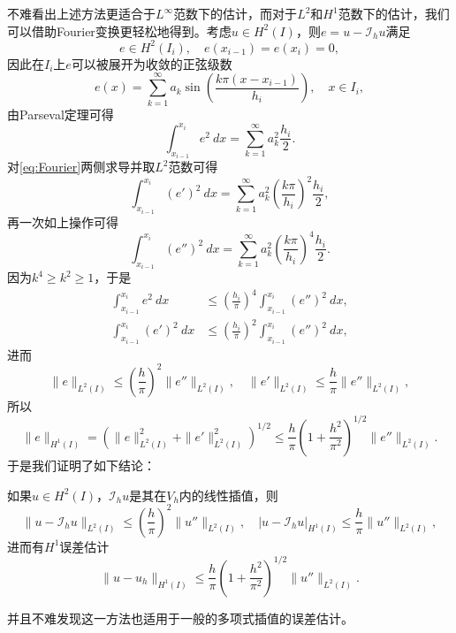 \documentclass[a4paper,10pt]{ctexart}
\begin{document}
不难看出上述方法更适合于$ L^\infty $范数下的估计，而对于$ L^2 $和$ H^1 $范数下的估计，我们可以借助Fourier变换更轻松地得到。考虑$ u\in H^2(I) $，则$ e = u - \mathcal{I}_h u $满足
\[
    e\in H^2(I_i),\quad e(x_{i-1}) = e(x_i) = 0,
\]
因此在$ I_i $上$ e $可以被展开为收敛的正弦级数
\begin{equation}\label{eq:Fourier}
    e(x) = \sum_{k=1}^\infty a_k \sin\left( \frac{k \pi(x-x_{i-1})}{h_i} \right) ,\quad x\in I_i,
\end{equation}
由Parseval定理可得
\begin{equation}
    \int_{x_{i-1}}^{x_i} e^2\ dx = \sum_{k=1}^\infty a_k^2 \frac{h_i}{2}.
\end{equation}
对\eqref{eq:Fourier}两侧求导并取$ L^2 $范数可得
\begin{equation}
    \int_{x_{i-1}}^{x_i} (e')^2\ dx = \sum_{k=1}^\infty a_k^2 \left( \frac{k\pi}{h_i} \right)^2 \frac{h_i}{2},
\end{equation}
再一次如上操作可得
\begin{equation}
    \int_{x_{i-1}}^{x_i} (e'')^2\ dx = \sum_{k=1}^\infty a_k^2 \left( \frac{k\pi}{h_i} \right)^4 \frac{h_i}{2}.
\end{equation}
因为$ k^4\geqslant k^2\geqslant 1 $，于是
\begin{equation}
    \begin{aligned}
        \int_{x_{i-1}}^{x_i} e^2\ dx &\leqslant \left( \frac{h_i}{\pi} \right)^4 \int_{x_{i-1}}^{x_i} (e'')^2\ dx,\\
        \int_{x_{i-1}}^{x_i} (e')^2\ dx &\leqslant \left( \frac{h_i}{\pi} \right)^2 \int_{x_{i-1}}^{x_i} (e'')^2\ dx,
    \end{aligned}
\end{equation}
进而
\[
    \| e \|_{L^2(I)} \leqslant \left( \frac{h}{\pi} \right)^2 \| e'' \|_{L^2(I)},\quad \| e' \|_{L^2(I)} \leqslant \frac{h}{\pi} \| e'' \|_{L^2(I)},
\]
所以
\begin{equation}
    \| e \|_{H^1(I)} = (\| e \|_{L^2(I)}^2 + \| e' \|_{L^2(I)}^2)^{1 / 2} \leqslant \frac{h}{\pi}\left( 1 + \frac{h^2}{\pi^2} \right)^{1 / 2} \| e'' \|_{L^2(I)}.
\end{equation}
于是我们证明了如下结论：
\begin{theorem}
    如果$ u\in H^2(I) $，$ \mathcal{I}_h u $是其在$ V_h $内的线性插值，则
    \begin{equation}
        \| u - \mathcal{I}_h u \|_{L^2(I)} \leqslant \left( \frac{h}{\pi} \right)^2 \| u'' \|_{L^2(I)},\quad | u - \mathcal{I}_h u |_{H^1(I)} \leqslant \frac{h}{\pi} \| u'' \|_{L^2(I)},
    \end{equation}
    进而有$ H^1 $误差估计
    \begin{equation}
        \| u - u_h \|_{H^1(I)} \leqslant \frac{h}{\pi}\left( 1 + \frac{h^2}{\pi^2} \right)^{1 / 2} \| u'' \|_{L^2(I)}.
    \end{equation}
\end{theorem}
\noindent 并且不难发现这一方法也适用于一般的多项式插值的误差估计。
\end{document}
